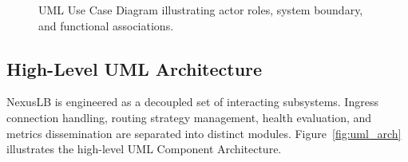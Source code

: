 \documentclass[12pt,openany]{report}
\begin{document}
\begin{figure}[!htbp]
{%
}
\caption{UML Use Case Diagram illustrating actor roles, system boundary, and functional associations.}
\label{fig:usecase_diagram}
\end{figure}

\clearpage
\subsection{High-Level UML Architecture}

NexusLB is engineered as a decoupled set of interacting subsystems. Ingress connection handling, routing strategy management, health evaluation, and metrics dissemination are separated into distinct modules. Figure~\ref{fig:uml_arch} illustrates the high-level UML Component Architecture.
\end{document}
